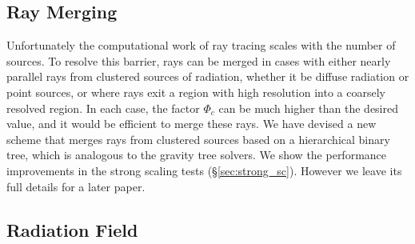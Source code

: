 \documentclass[apj,onecolumn]{emulateapj}
\begin{document}
\subsection{Ray Merging}

Unfortunately the computational work of ray tracing scales with the
number of sources.  To resolve this barrier, rays can be merged in
cases with either nearly parallel rays from clustered sources of
radiation, whether it be diffuse radiation or point sources, or where
rays exit a region with high resolution into a coarsely resolved
region.  In each case, the factor $\Phi_c$ can be much higher than the
desired value, and it would be efficient to merge these rays.  We have
devised a new scheme that merges rays from clustered sources based on
a hierarchical binary tree, which is analogous to the gravity tree
solvers.  We show the performance improvements in the strong scaling
tests (\S\ref{sec:strong_sc}).  However we leave its full details for
a later paper.

\subsection{Radiation Field}
\end{document}
